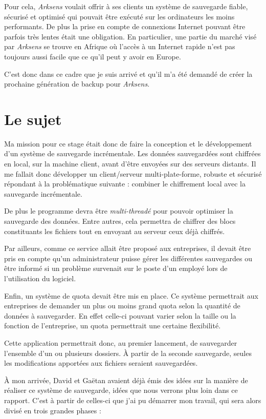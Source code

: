 \documentclass[a4paper,10pt, twoside]{report}
\begin{document}
\begin{spacing}{1.2}
Pour cela, \textit{Arksens} voulait offrir à ses clients un système de
sauvegarde fiable, sécurisé et optimisé qui pouvait être
exécuté sur les ordinateurs les moins performants. De plus la prise en
compte de connexions Internet pouvant être parfois très lentes était une
obligation. En particulier, une partie du marché visé par \textit{Arksens}
se trouve en Afrique où l'accès à un Internet rapide n'est pas toujours
aussi facile que ce qu'il peut y avoir en Europe.

C'est donc dans ce cadre que je suis arrivé et qu'il m'a été demandé
de créer la prochaine génération de backup pour \textit{Arksens}.

\section{Le sujet}

Ma mission pour ce stage était donc de faire la conception et le
développement d'un système de sauvegarde incrémentale. Les données
sauvegardées sont chiffrées en local, sur la machine client, avant d'être
envoyées sur des serveurs distants. Il me fallait donc développer un
client/serveur multi-plate-forme, robuste et sécurisé répondant à
la problématique suivante : combiner le chiffrement local avec la sauvegarde
incrémentale.

De plus le programme devra être \textit{multi-threadé} pour pouvoir
optimiser la sauvegarde des données. Entre autres, cela permettra de chiffrer
des blocs constituants les fichiers tout en envoyant au serveur ceux déjà
chiffrés.

Par ailleurs, comme ce service allait être proposé aux entreprises, il devait
être pris en compte qu'un administrateur puisse gérer les différentes
sauvegardes ou être informé si un problème survenait sur le poste d'un employé
lors de l'utilisation du logiciel.

Enfin, un système de quota devait être mis en place. Ce système permettrait
aux entreprises de demander un plus ou moins grand quota selon la quantité de
données à sauvegarder. En effet celle-ci pouvant varier selon la taille ou la
fonction de l'entreprise, un quota permettrait une certaine flexibilité.

Cette application permettrait donc, au premier lancement, de sauvegarder
l'ensemble d'un ou plusieurs dossiers. À partir de la seconde sauvegarde, seules
les modifications apportées aux fichiers seraient sauvegardées.

À mon arrivée, David et Gaëtan avaient déjà émis des idées sur la
manière de réaliser ce système de sauvegarde, idées que nous verrons
plus loin dans ce rapport. C'est à partir de celles-ci que j'ai pu
démarrer mon travail, qui sera alors divisé en trois grandes phases :


\end{spacing}
\end{document}
